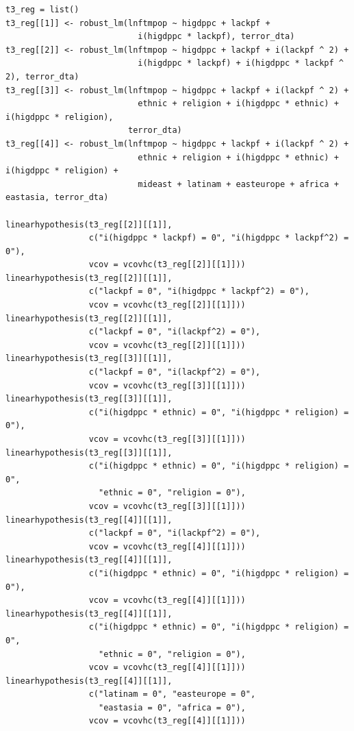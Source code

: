 \documentclass[12pt,letterpaper]{article}
\theoremstyle{definition}
\begin{document}
\begin{Verbatim}[fontsize=\small]
t3_reg = list()
t3_reg[[1]] <- robust_lm(lnftmpop ~ higdppc + lackpf +
                           i(higdppc * lackpf), terror_dta)
t3_reg[[2]] <- robust_lm(lnftmpop ~ higdppc + lackpf + i(lackpf ^ 2) +
                           i(higdppc * lackpf) + i(higdppc * lackpf ^ 2), terror_dta)
t3_reg[[3]] <- robust_lm(lnftmpop ~ higdppc + lackpf + i(lackpf ^ 2) +
                           ethnic + religion + i(higdppc * ethnic) + i(higdppc * religion),
                         terror_dta)
t3_reg[[4]] <- robust_lm(lnftmpop ~ higdppc + lackpf + i(lackpf ^ 2) +
                           ethnic + religion + i(higdppc * ethnic) + i(higdppc * religion) +
                           mideast + latinam + easteurope + africa + eastasia, terror_dta)

linearhypothesis(t3_reg[[2]][[1]],
                 c("i(higdppc * lackpf) = 0", "i(higdppc * lackpf^2) = 0"),
                 vcov = vcovhc(t3_reg[[2]][[1]]))
linearhypothesis(t3_reg[[2]][[1]],
                 c("lackpf = 0", "i(higdppc * lackpf^2) = 0"),
                 vcov = vcovhc(t3_reg[[2]][[1]]))
linearhypothesis(t3_reg[[2]][[1]],
                 c("lackpf = 0", "i(lackpf^2) = 0"),
                 vcov = vcovhc(t3_reg[[2]][[1]]))
linearhypothesis(t3_reg[[3]][[1]],
                 c("lackpf = 0", "i(lackpf^2) = 0"),
                 vcov = vcovhc(t3_reg[[3]][[1]]))
linearhypothesis(t3_reg[[3]][[1]],
                 c("i(higdppc * ethnic) = 0", "i(higdppc * religion) = 0"),
                 vcov = vcovhc(t3_reg[[3]][[1]]))
linearhypothesis(t3_reg[[3]][[1]],
                 c("i(higdppc * ethnic) = 0", "i(higdppc * religion) = 0",
                   "ethnic = 0", "religion = 0"),
                 vcov = vcovhc(t3_reg[[3]][[1]]))
linearhypothesis(t3_reg[[4]][[1]],
                 c("lackpf = 0", "i(lackpf^2) = 0"),
                 vcov = vcovhc(t3_reg[[4]][[1]]))
linearhypothesis(t3_reg[[4]][[1]],
                 c("i(higdppc * ethnic) = 0", "i(higdppc * religion) = 0"),
                 vcov = vcovhc(t3_reg[[4]][[1]]))
linearhypothesis(t3_reg[[4]][[1]],
                 c("i(higdppc * ethnic) = 0", "i(higdppc * religion) = 0",
                   "ethnic = 0", "religion = 0"),
                 vcov = vcovhc(t3_reg[[4]][[1]]))
linearhypothesis(t3_reg[[4]][[1]],
                 c("latinam = 0", "easteurope = 0",
                   "eastasia = 0", "africa = 0"),
                 vcov = vcovhc(t3_reg[[4]][[1]]))
\end{Verbatim}
\end{document}
